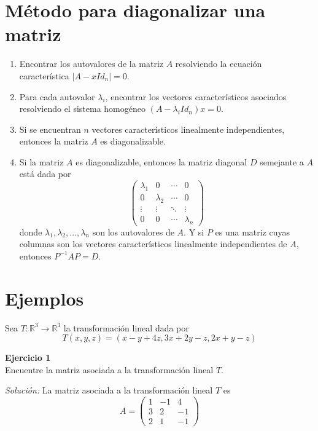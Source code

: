 \documentclass{article}
\newenvironment{problem}[2][Ejercicio]
    { \begin{mdframed}[backgroundcolor=gray!20] \textbf{#1 #2} \\}
    {  \end{mdframed}}
\newenvironment{solution}
    {\textit{Solución:}}
    {}
\begin{document}
\section*{Método para diagonalizar una matriz}
\begin{enumerate}
    \item Encontrar los autovalores de la matriz $A$ resolviendo la ecuación característica $|A - xId_n| = 0$.
    \item Para cada autovalor $\lambda_i$, encontrar los vectores característicos asociados resolviendo el sistema homogéneo $(A - \lambda_i Id_n)x = 0$.
    \item Si se encuentran $n$ vectores característicos linealmente independientes, entonces la matriz $A$ es diagonalizable.
    \item Si la matriz $A$ es diagonalizable, entonces la matriz diagonal $D$ semejante a $A$ está dada por
    $$
    \begin{pmatrix}
    \lambda_1 & 0 & \cdots & 0 \\
    0 & \lambda_2 & \cdots & 0 \\
    \vdots & \vdots & \ddots & \vdots \\
    0 & 0 & \cdots & \lambda_n
    \end{pmatrix}
    $$
    donde $\lambda_1, \lambda_2, \ldots, \lambda_n$ son los autovalores de $A$. Y si $P$ es una matriz cuyas columnas son los vectores característicos linealmente independientes de $A$, entonces $P^{-1}AP = D$.
\end{enumerate}

\section*{Ejemplos}
Sea $T:\mathbb{R}^3 \to \mathbb{R}^3$ la transformación lineal dada por
$$
T(x,y,z) = (x-y+4z, 3x+2y-z,2x+y-z)
$$
\begin{problem}{1}
    Encuentre la matriz asociada a la transformación lineal $T$.
\end{problem}
\begin{solution}
    La matriz asociada a la transformación lineal $T$ es
    $$
    A = \begin{pmatrix}
    1 & -1 & 4 \\
    3 & 2 & -1 \\
    2 & 1 & -1
    \end{pmatrix}
    $$
\end{solution}
\end{document}
